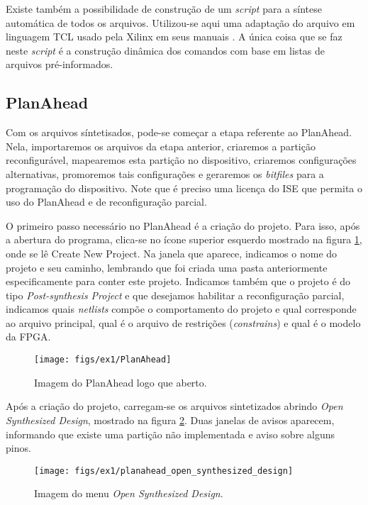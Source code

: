 \documentclass[11pt,a4paper,oneside]{book}
\begin{document}
Existe também a possibilidade de construção de um \textit{script} para a síntese automática de todos os arquivos.
Utilizou-se aqui uma adaptação do arquivo em linguagem TCL usado pela Xilinx em seus manuais \cite{ug702, ug743, ug744}.
A única coisa que se faz neste \textit{script} é a construção dinâmica dos comandos com base em listas de arquivos pré-informados.

\subsection{PlanAhead}
Com os arquivos síntetisados, pode-se começar a etapa referente ao PlanAhead.
Nela, importaremos os arquivos da etapa anterior, criaremos a partição reconfigurável, mapearemos esta partição no dispositivo, criaremos configurações alternativas, promoremos tais configurações e geraremos os \textit{bitfiles} para a programação do dispositivo.
Note que é preciso uma licença do ISE que permita o uso do PlanAhead e de reconfiguração parcial.

O primeiro passo necessário no PlanAhead é a criação do projeto.
Para isso, após a abertura do programa, clica-se no ícone superior esquerdo mostrado na figura \ref{fig:ex1:planahead}, onde se lê \dlq{}Create New Project\drq{}.
Na janela que aparece, indicamos o nome do projeto e seu caminho, lembrando que foi criada uma pasta anteriormente especificamente para conter este projeto.
Indicamos também que o projeto é do tipo \dlq{}\textit{Post-synthesis Project}\drq{} e que desejamos habilitar a reconfiguração parcial, indicamos quais \textit{netlists} compõe o comportamento do projeto e qual corresponde ao arquivo principal, qual é o arquivo de restrições (\textit{constrains}) e qual é o modelo da FPGA.

\begin{figure}[h]
\centering
\texttt{[image: figs/ex1/PlanAhead]}
\caption{Imagem do PlanAhead logo que aberto.}
\label{fig:ex1:planahead}
\end{figure}

Após a criação do projeto, carregam-se os arquivos sintetizados abrindo \dlq{}\textit{Open Synthesized Design}\drq{}, mostrado na figura \ref{fig:ex1:planahead_open_synthesized_design}.
Duas janelas de avisos aparecem, informando que existe uma partição não implementada e aviso sobre alguns pinos.

\begin{figure}[h]
\centering
\texttt{[image: figs/ex1/planahead\_open\_synthesized\_design]}
\caption{Imagem do menu \dlq{}\textit{Open Synthesized Design}\drq{}.}
\label{fig:ex1:planahead_open_synthesized_design}
\end{figure}
\end{document}

